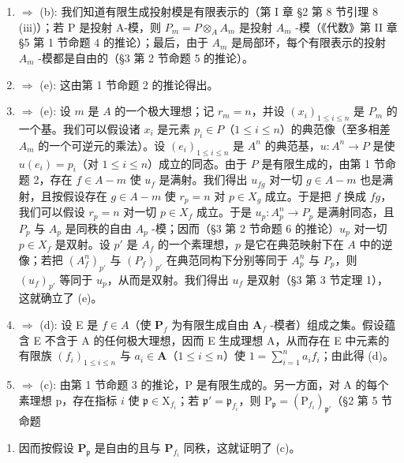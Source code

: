 \begin{enumerate}
\def\labelenumi{(\alph{enumi})}
\item
  \(\Rightarrow\) (b): 我们知道有限生成投射模是有限表示的（第 I 章 §2 第 8 节引理 8 (iii)）；若 P 是投射 A-模，则 \(P_{m} = P \otimes_{A} A_{m}\) 是投射 \(A_{m}\) -模（《代数》第 II 章 §5 第 1 节命题 4 的推论）；最后，由于 \(A_{m}\) 是局部环，每个有限表示的投射 \(A_{m}\) -模都是自由的（§3 第 2 节命题 5 的推论）。
\item
  \(\Rightarrow\) (e): 这由第 1 节命题 2 的推论得出。
\item
  \(\Rightarrow\) (e): 设 \(m\) 是 \(A\) 的一个极大理想；记 \(r_m = n\)，并设 \((x_i)_{1 \leqslant i \leqslant n}\) 是 \(P_m\) 的一个基。我们可以假设诸 \(x_i\) 是元素 \(p_i \in P\)（\(1 \leqslant i \leqslant n\)）的典范像（至多相差 \(A_m\) 的一个可逆元的乘法）。设 \((e_i)_{1 \leqslant i \leqslant n}\) 是 \(A^n\) 的典范基，\(u: A^n \to P\) 是使 \(u(e_i) = p_i\)（对 \(1 \leqslant i \leqslant n\)）成立的同态。由于 \(P\) 是有限生成的，由第 1 节命题 2，存在 \(f \in A - m\) 使 \(u_f\) 是满射。我们得出 \(u_{fg}\) 对一切 \(g \in A - m\) 也是满射，且按假设存在 \(g \in A - m\) 使 \(r_p = n\) 对 \(p \in X_g\) 成立。于是把 \(f\) 换成 \(fg\)，我们可以假设 \(r_p = n\) 对一切 \(p \in X_f\) 成立。于是 \(u_p: A_p^n \to P_p\) 是满射同态，且 \(P_p\) 与 \(A_p\) 是同秩的自由 \(A_p\) -模；因而（§3 第 2 节命题 6 的推论）\(u_p\) 对一切 \(p \in X_f\) 是双射。设 \(p'\) 是 \(A_f\) 的一个素理想，\(p\) 是它在典范映射下在 \(A\) 中的逆像；若把 \((A_f^n)_{p'}\) 与 \((P_f)_{p'}\) 在典范同构下分别等同于 \(A_p^n\) 与 \(P_p\)，则 \((u_f)_{p'}\) 等同于 \(u_p\)，从而是双射。我们得出 \(u_f\) 是双射（§3 第 3 节定理 1），这就确立了 (e)。
\item
  \(\Rightarrow\) (d): 设 E 是 \(f\in A\)（使 \(\mathbf{P}_f\) 为有限生成自由 \(\mathbf{A}_f\) -模者）组成之集。假设蕴含 E 不含于 A 的任何极大理想，因而 E 生成理想 A，从而存在 E 中元素的有限族 \((f_{i})_{1 \leqslant i \leqslant n}\) 与 \(a_{i} \in \mathbf{A}\)（\(1 \leqslant i \leqslant n\)）使 \(1 = \sum_{i=1}^{n} a_{i} f_{i}\)；由此得 (d)。
\item
  \(\Rightarrow\) (c): 由第 1 节命题 3 的推论，P 是有限生成的。另一方面，对 A 的每个素理想 p，存在指标 \(i\) 使 \(\mathfrak{p} \in \mathrm{X}_{f_i}\)；若 \(\mathfrak{p}' = \mathfrak{p}_{f_i}\)，则 \(\mathrm{P}_{\mathfrak{p}} = (\mathrm{P}_{f_i})_{\mathfrak{p}'}\)（§2 第 5 节命题
\end{enumerate}

\begin{enumerate}
\def\labelenumi{\arabic{enumi})}
\setcounter{enumi}{9}
\tightlist
\item
因而按假设 \(\mathbf{P}_{\mathfrak{p}}\) 是自由的且与 \(\mathbf{P}_{f_i}\) 同秩，这就证明了 (c)。
\end{enumerate}

